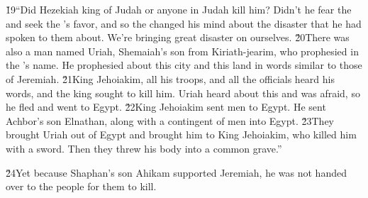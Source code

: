 \v{19}``Did Hezekiah king of Judah or anyone in Judah kill him? Didn't he fear the  and seek the 's favor, and so the  changed his mind about the disaster that he had spoken to them about. We're bringing great disaster on ourselves. \v{20}There was also a man named Uriah, Shemaiah's son from Kiriath-jearim, who prophesied in the 's name. He prophesied about this city and this land in words similar to those of Jeremiah. \v{21}King Jehoiakim, all his troops, and all the officials heard his words, and the king sought to kill him. Uriah heard about this and was afraid, so he fled and went to Egypt. \v{22}King Jehoiakim sent men to Egypt. He sent Achbor's son Elnathan, along with a contingent of men into Egypt. \v{23}They brought Uriah out of Egypt and brought him to King Jehoiakim, who killed him with a sword. Then they threw his body into a common grave.''

\v{24}Yet because Shaphan's son Ahikam supported Jeremiah, he was not handed over to the people for them to kill.


